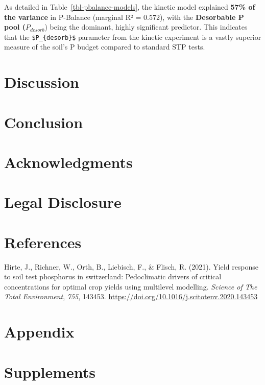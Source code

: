 \documentclass[
  a4paper,
]{article}
\newlength{\cslhangindent}
\newenvironment{CSLReferences}[2] %
 {\begin{list}{}{%
  \setlength{\itemindent}{0pt}
  \setlength{\leftmargin}{0pt}
  \setlength{\parsep}{0pt}
  \ifodd #1
   \setlength{\leftmargin}{\cslhangindent}
   \setlength{\itemindent}{-1\cslhangindent}
  \fi
  \setlength{\itemsep}{#2\baselineskip}}}
 {\end{list}}
\begin{document}
As detailed in Table~\ref{tbl-pbalance-models}, the kinetic model
explained \textbf{57\% of the variance} in P-Balance (marginal R² =
0.572), with the \textbf{Desorbable P pool (}\(P_{desorb}\)) being the
dominant, highly significant predictor. This indicates that the
\texttt{\$P\_\{desorb\}\$} parameter from the kinetic experiment is a
vastly superior measure of the soil's P budget compared to standard STP
tests.

\section{Discussion}\label{discussion}

\section{Conclusion}\label{conclusion}

\section{Acknowledgments}\label{acknowledgments}

\section{Legal Disclosure}\label{legal-disclosure}

\section{References}\label{references}

\label{refs}
\begin{CSLReferences}{1}{0}
Hirte, J., Richner, W., Orth, B., Liebisch, F., \& Flisch, R. (2021).
Yield response to soil test phosphorus in switzerland: Pedoclimatic
drivers of critical concentrations for optimal crop yields using
multilevel modelling. \emph{Science of The Total Environment},
\emph{755}, 143453.
\url{https://doi.org/10.1016/j.scitotenv.2020.143453}

\end{CSLReferences}

\section{Appendix}\label{appendix}

\section{Supplements}\label{supplements}
\end{document}
